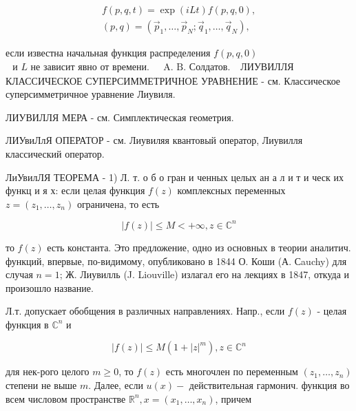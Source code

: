\documentclass[10pt]{article}
\begin{document}
\[

\begin{gathered}

f(p, q, t)=\exp (i L t) f(p, q, 0), \\

(p, q)=\left(\vec{p}_{1}, \ldots, \vec{p}_{N} ; \vec{q}_{1}, \ldots, \vec{q}_{N}\right),

\end{gathered}

\]



если известна начальная функция распределения $f(p, q, 0)$ $\begin{array}{ll}\text { и } L \text { не зависит явно от времени. } & \text { A. B. Солдатов. }\end{array}$ ЛИУВИЛЛЯ КЛАССИЧЕСКОЕ СУПЕРСИММЕТРИЧНОЕ УРАВНЕНИЕ - см. Классическое суперсимметричное уравнение Лиувиля.



ЛИУВИЛЛЯ МЕРА - см. Симплектическая геометрия.



ЛИУвиЛлЯ ОПЕРАТОР - см. Лиувиляя квантовый оператор, Лиувилля классический оператор.



ЛиУвилЛЯ ТЕОРЕМА - 1) Л. т. о б о гран и ченных целых ан а л и т и ческ их функц и я х: если целая функция $f(z)$ комплексных переменных $z=\left(z_{1}, \ldots, z_{n}\right)$ ограничена, то есть



\[

|f(z)| \leqslant M<+\infty, z \in \mathbb{C}^{n}

\]



то $f(z)$ есть константа. Это предложение, одно из основных в теории аналитич. функций, впервые, по-видимому, опубликовано в 1844 О. Коши (А. Сauchy) для случая $n=1$; Ж. Лиувилль (J. Liouville) излагал его на лекциях в 1847, откуда и произошло название.



Л.т. допускает обобщения в различных направлениях. Напр., если $f(z)$ - целая функция в $\mathbb{C}^{n}$ и



\[

|f(z)| \leqslant M\left(1+|z|^{m}\right), z \in \mathbb{C}^{n}

\]



для нек-рого целого $m \geqslant 0$, то $f(z)$ есть многочлен по переменным $\left(z_{1}, \ldots, z_{n}\right)$ степени не выше $m$. Далее, если $u(x)-$ действительная гармонич. функция во всем числовом пространстве $\mathbb{R}^{n}, x=\left(x_{1}, \ldots, x_{n}\right)$, причем
\end{document}
